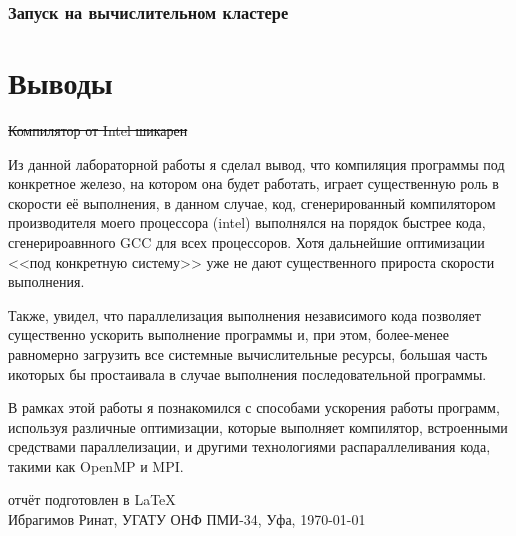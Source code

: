 \documentclass[a4paper,12pt]{article}
\begin{document}
\subsubsection{Запуск на вычислительном кластере}

\newpage
\section{Выводы}
\sout{Компилятор от Intel шикарен}

Из данной лабораторной работы я сделал вывод, что компиляция программы под конкретное железо, на котором она будет работать, играет существенную роль в скорости её выполнения, в данном случае, код, сгенерированный компилятором производителя моего процессора (intel) выполнялся на порядок быстрее кода, сгенерироавнного GCC для всех процессоров. Хотя дальнейшие оптимизации <<под конкретную систему>> уже не дают существенного прироста скорости выполнения.

Также, увидел, что параллелизация выполнения независимого кода позволяет существенно ускорить выполнение программы и, при этом, более-менее равномерно загрузить все системные вычислительные ресурсы, большая часть икоторых бы простаивала в случае выполнения последовательной программы.

В рамках этой работы я познакомился с способами ускорения работы программ, используя различные оптимизации, которые выполняет компилятор, встроенными средствами параллелизации, и другими технологиями распараллеливания кода, такими как OpenMP и MPI.
\vfill
\begin{center}
\small отчёт подготовлен в \LaTeX\\
Ибрагимов Ринат, УГАТУ ОНФ ПМИ-34, Уфа, \today
\end{center}
\end{document}
